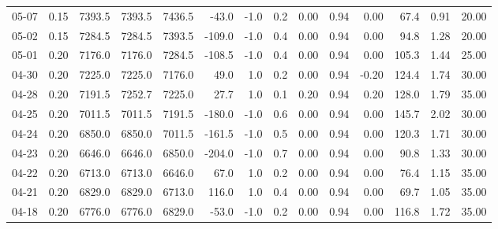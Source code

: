 \begin{threeparttable}
{\begin{tabular}{lrrrrrrrrrrrrr}
  05-07 &     0.15 & 7393.5 & 7393.5 & 7436.5 &      -43.0 &                     -1.0 &                 0.2 &       0.00 &      0.94 &           0.00 &             67.4 &            0.91 &                  20.00 \\
  05-02 &     0.15 & 7284.5 & 7284.5 & 7393.5 &     -109.0 &                     -1.0 &                 0.4 &       0.00 &      0.94 &           0.00 &             94.8 &            1.28 &                  20.00 \\
  05-01 &     0.20 & 7176.0 & 7176.0 & 7284.5 &     -108.5 &                     -1.0 &                 0.4 &       0.00 &      0.94 &           0.00 &            105.3 &            1.44 &                  25.00 \\
  04-30 &     0.20 & 7225.0 & 7225.0 & 7176.0 &       49.0 &                      1.0 &                 0.2 &       0.00 &      0.94 &          -0.20 &            124.4 &            1.74 &                  30.00 \\
  04-28 &     0.20 & 7191.5 & 7252.7 & 7225.0 &       27.7 &                      1.0 &                 0.1 &       0.20 &      0.94 &           0.20 &            128.0 &            1.79 &                  35.00 \\
  04-25 &     0.20 & 7011.5 & 7011.5 & 7191.5 &     -180.0 &                     -1.0 &                 0.6 &       0.00 &      0.94 &           0.00 &            145.7 &            2.02 &                  30.00 \\
  04-24 &     0.20 & 6850.0 & 6850.0 & 7011.5 &     -161.5 &                     -1.0 &                 0.5 &       0.00 &      0.94 &           0.00 &            120.3 &            1.71 &                  30.00 \\
  04-23 &     0.20 & 6646.0 & 6646.0 & 6850.0 &     -204.0 &                     -1.0 &                 0.7 &       0.00 &      0.94 &           0.00 &             90.8 &            1.33 &                  30.00 \\
  04-22 &     0.20 & 6713.0 & 6713.0 & 6646.0 &       67.0 &                      1.0 &                 0.2 &       0.00 &      0.94 &           0.00 &             76.4 &            1.15 &                  35.00 \\
  04-21 &     0.20 & 6829.0 & 6829.0 & 6713.0 &      116.0 &                      1.0 &                 0.4 &       0.00 &      0.94 &           0.00 &             69.7 &            1.05 &                  35.00 \\
  04-18 &     0.20 & 6776.0 & 6776.0 & 6829.0 &      -53.0 &                     -1.0 &                 0.2 &       0.00 &      0.94 &           0.00 &            116.8 &            1.72 &                  35.00 \\

\end{tabular}}
\end{threeparttable}
